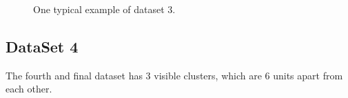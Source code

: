  \begin{figure}[hbtp]
   \centering
       \caption{One typical example of dataset 3.}
       \label{data3}
\end{figure}




\subsection{DataSet 4}


The fourth and final dataset has 3 visible clusters, which are 6 units apart from each other.\\ 

